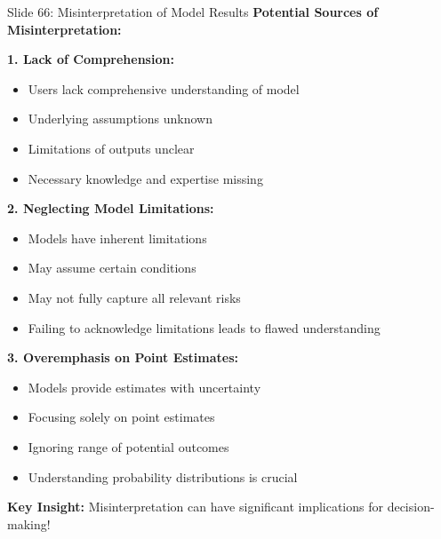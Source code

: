 \documentclass[8pt]{beamer}
\begin{document}
	
	\begin{frame}{Slide 66: Misinterpretation of Model Results}
		\fontsize{6.5}{7.5}\selectfont
		\textbf{Potential Sources of Misinterpretation:}
		
		\vspace{0.1cm}
		\textbf{1. Lack of Comprehension:}
		\begin{itemize}
			\item Users lack comprehensive understanding of model
			\item Underlying assumptions unknown
			\item Limitations of outputs unclear
			\item Necessary knowledge and expertise missing
		\end{itemize}
		
		\vspace{0.1cm}
		\textbf{2. Neglecting Model Limitations:}
		\begin{itemize}
			\item Models have inherent limitations
			\item May assume certain conditions
			\item May not fully capture all relevant risks
			\item Failing to acknowledge limitations leads to flawed understanding
		\end{itemize}
		
		\vspace{0.1cm}
		\textbf{3. Overemphasis on Point Estimates:}
		\begin{itemize}
			\item Models provide estimates with uncertainty
			\item Focusing solely on point estimates
			\item Ignoring range of potential outcomes
			\item Understanding probability distributions is crucial
		\end{itemize}
		
		\textcolor{myblue}{\textbf{Key Insight:}} Misinterpretation can have \textcolor{myblue}{significant implications for decision-making}!
	\end{frame}
	
\end{document}
